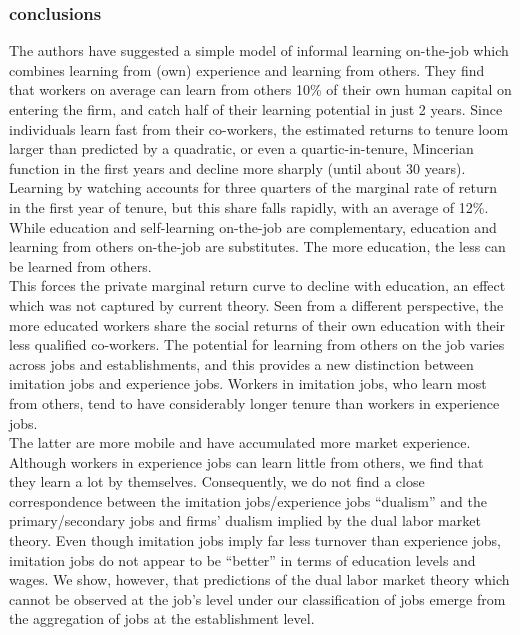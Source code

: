 \documentclass[12pt,a4paper]{article}
\begin{document}
  \subsubsection{conclusions} %
  \label{ssub:conclusions}
  The authors have suggested a simple model of informal learning on-the-job
  which combines learning from (own) experience and learning from others.  They
  find that workers on average can learn from others 10\% of their own human
  capital on entering the firm, and catch half of their learning potential in
  just 2 years. Since individuals learn fast from their co-workers, the
  estimated returns to tenure loom larger than predicted by a quadratic, or
  even a quartic-in-tenure, Mincerian function in the first years and decline
  more sharply (until about 30 years). Learning by watching accounts for three
  quarters of the marginal rate of return in the first year of tenure, but this
  share falls rapidly, with an average of 12\%. While education and
  self-learning on-the-job are complementary, education and learning from
  others on-the-job are substitutes. The more education, the less can be
  learned from others.\\
  This forces the private marginal return curve to decline with education, an
  effect which was not captured by current theory.  Seen from a different
  perspective, the more educated workers share the social returns of their own
  education with their less qualified co-workers.  The potential for learning
  from others on the job varies across jobs and establishments, and this
  provides a new distinction between imitation jobs and experience jobs.
  Workers in imitation jobs, who learn most from others, tend to have
  considerably longer tenure than workers in experience jobs.\\
  The latter are more mobile and have accumulated more market experience.
  Although workers in experience jobs can learn little from others, we find
  that they learn a lot by themselves. Consequently, we do not find a close
  correspondence between the imitation jobs/experience jobs “dualism” and the
  primary/secondary jobs and firms’ dualism implied by the dual labor market
  theory. Even though imitation jobs imply far less turnover than experience
  jobs, imitation jobs do not appear to be “better” in terms of education
  levels and wages. We show, however, that predictions of the dual labor market
  theory which cannot be observed at the job’s level under our classification
  of jobs emerge from the aggregation of jobs at the establishment level. 
\end{document}
